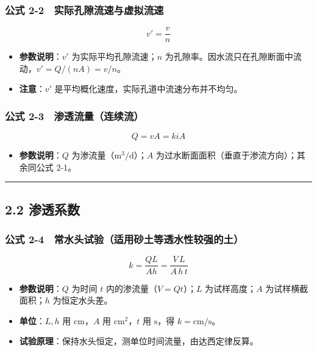 \documentclass[
]{article}
\providecommand{\tightlist}{%
  \setlength{\itemsep}{0pt}\setlength{\parskip}{0pt}}
\begin{document}
\subsubsection{公式
2-2　实际孔隙流速与虚拟流速}\label{ux516cux5f0f-2-2-ux5b9eux9645ux5b54ux9699ux6d41ux901fux4e0eux865aux62dfux6d41ux901f}

\[v'=\frac{v}{n}\]

\begin{itemize}
\tightlist
\item
  \textbf{参数说明}：\(v'\) 为实际平均孔隙流速；\(n\)
  为孔隙率。因水流只在孔隙断面中流动，\(v' = Q/(nA) = v/n\)。
\item
  \textbf{注意}：\(v'\) 是平均概化速度，实际孔道中流速分布并不均匀。
\end{itemize}

\subsubsection{公式
2-3　渗透流量（连续流）}\label{ux516cux5f0f-2-3-ux6e17ux900fux6d41ux91cfux8fdeux7eedux6d41}

\[Q=vA=kiA\]

\begin{itemize}
\tightlist
\item
  \textbf{参数说明}：\(Q\) 为渗流量（\(\mathrm{m^3/d}\)）；\(A\)
  为过水断面面积（垂直于渗流方向）；其余同公式 2-1。
\end{itemize}

\begin{center}\rule{0.5\linewidth}{0.5pt}\end{center}

\subsection{2.2 渗透系数}\label{ux6e17ux900fux7cfbux6570}

\subsubsection{公式
2-4　常水头试验（适用砂土等透水性较强的土）}\label{ux516cux5f0f-2-4-ux5e38ux6c34ux5934ux8bd5ux9a8cux9002ux7528ux7802ux571fux7b49ux900fux6c34ux6027ux8f83ux5f3aux7684ux571f}

\[k=\frac{QL}{Ah}=\frac{V\,L}{A\,h\,t}\]

\begin{itemize}
\tightlist
\item
  \textbf{参数说明}：\(Q\) 为时间 \(t\) 内的渗流量（\(V=Qt\)）；\(L\)
  为试样高度；\(A\) 为试样横截面积；\(h\) 为恒定水头差。
\item
  \textbf{单位}：\(L,h\) 用 \(\mathrm{cm}\)，\(A\) 用
  \(\mathrm{cm^2}\)，\(t\) 用 \(\mathrm{s}\)，得 \(k=\mathrm{cm/s}\)。
\item
  \textbf{试验原理}：保持水头恒定，测单位时间流量，由达西定律反算。
\end{itemize}
\end{document}
